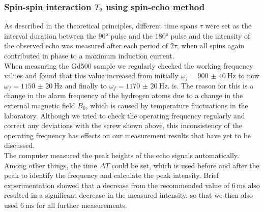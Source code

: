 \subsubsection{Spin-spin interaction $T_2$ using spin-echo method}
As described in the theoretical principles, different time spans $\tau$ were set as the interval duration between the $\ang{90}$ pulse and the $\ang{180}$ pulse and the intensity of the observed echo was measured after each period of $2\tau$, when all spins again contributed in phase to a maximum induction current.\\
When measuring the Gd500 sample we regularly checked the working frequency values and found that this value increased from initially $\omega_f=\SI{900(40)}{\hertz}$ to now $\omega_f=\SI{1150(20)}{\hertz}$ and finally to $\omega_f=\SI{1170(20)}{\hertz}$.
is.
The reason for this is a change in the alarm frequency of the hydrogen atoms due to a change in the external magnetic field $B_0$, which is caused by temperature fluctuations in the laboratory.
Although we tried to check the operating frequency regularly and correct any deviations with the screw shown above, this inconsistency of the operating frequency has effects on our measurement results that have yet to be discussed.\\

The computer measured the peak heights of the echo signals automatically.
Among other things, the time $\Delta T$ could be set, which is used before and after the peak to identify the frequency and calculate the peak intensity.
Brief experimentation showed that a decrease from the recommended value of $\SI{6}{\milli\second}$ also resulted in a significant decrease in the measured intensity, so that we then also used $\SI{6}{\milli\second}$ for all further measurements.\\

